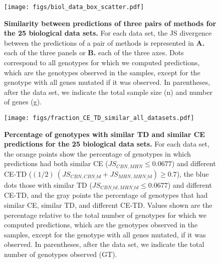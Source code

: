 \documentclass[a4paper,10pt]{article}
\begin{document}
\begin{figure}[!h]
  \centering
  \texttt{[image: figs/biol\_data\_box\_scatter.pdf]}

  \caption{\textbf{Similarity between predictions of three pairs of
      methods for the 25 biological data sets.} For each data set, the JS
    divergence between the predictions of a pair of methods is represented in
    \textbf{A.}
    each of the three panels or \textbf{B.} each of the three axes. 
    Dots correspond to all genotypes
    for which we computed predictions, which are the genotypes observed in the
    samples, except for the genotype with all genes mutated if it was observed.
    In parentheses,
    after the data set, we indicate the total sample size (n) and number of genes (g).}
  
  \label{fig:biol_boxplots-3-comps} \end{figure}


\begin{figure}[!h]
  \centering
  \texttt{[image: figs/fraction\_CE\_TD\_similar\_all\_datasets.pdf]}

  \caption{\textbf{Percentage of genotypes with similar TD and similar CE
      predictions for the 25 biological data sets.} For each data set, the
    orange points show the percentage of genotypes in which predictions
    had both similar CE ($JS_{CBN, MHN} \le 0.0677$) and different CE-TD
    ($(1/2)\ (JS_{CBN, CBN\_td} + JS_{MHN, MHN\_td}) \ge 0.7$),  the
    blue dots those with similar TD ($JS_{CBN\_td, MHN\_td} \le 0.0677$)
    and different CE-TD, and the gray points the percentage of genotypes
    that had similar CE, similar TD, and different CE-TD. Values shown are the percentage relative to the
    total number of genotypes for which we computed predictions, which are
    the genotypes observed in the samples, except for the genotype with
    all genes mutated,
    if it was observed. In parentheses, after the data set, we indicate
    the total number of genotypes observed (GT).  %
  }
  
  \label{fig:biol_freqs} \end{figure}
\end{document}
